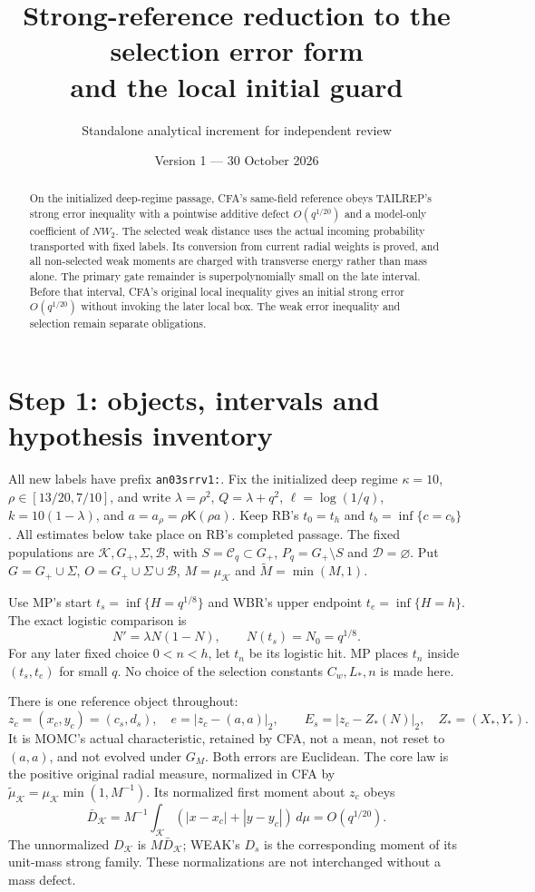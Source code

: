 \documentclass[11pt]{article}
\title{Strong-reference reduction to the selection error form\\
and the local initial guard}
\author{Standalone analytical increment for independent review}
\date{Version 1 --- 30 October 2026}
\numberwithin{equation}{section}
\theoremstyle{remark}\newtheorem{remark}[theorem]{Remark}
\newcommand{\dd}{\,d}\newcommand{\E}{\mathbb E}
\newcommand{\KK}{\mathcal K}\newcommand{\BB}{\mathcal B}
\newcommand{\Gp}{{G_+}}\newcommand{\eps}{\varepsilon}
\newcommand{\Kfun}{\mathsf K}\newcommand{\Ffun}{\mathsf F}
\begin{document}
\maketitle
\begin{abstract}
On the initialized deep-regime passage, CFA's same-field reference
obeys TAILREP's strong error inequality with a pointwise additive
defect $O(q^{1/20})$ and a model-only coefficient of $NW_2$.
The selected weak distance uses the actual incoming probability
transported with fixed labels. Its conversion from current radial
weights is proved, and all non-selected weak moments are charged
with transverse energy rather than mass alone. The primary gate
remainder is superpolynomially small on the late interval. Before
that interval, CFA's original local inequality gives an initial
strong error $O(q^{1/20})$ without invoking the later local box.
The weak error inequality and selection remain separate obligations.
\end{abstract}

\section{Step 1: objects, intervals and hypothesis inventory}
\label{an03srrv1:inventory}
All new labels have prefix \texttt{an03srrv1:}. Fix the initialized
deep regime $\kappa=10$, $\rho\in[13/20,7/10]$, and write
$\lambda=\rho^2$, $Q=\lambda+q^2$, $\ell=\log(1/q)$,
$k=10(1-\lambda)$, and $a=a_\rho=\rho\Kfun(\rho a)$.
Keep RB's $t_0=t_h$ and $t_b=\inf\{c=c_b\}$. All estimates
below take place on RB's completed passage.
The fixed populations are $\KK,\Gp,\Sigma,\BB$, with
$S=\mathcal C_q\subset\Gp$, $P_q=\Gp\setminus S$ and
$\mathcal D=\varnothing$. Put $G=\Gp\cup\Sigma$,
$O=\Gp\cup\Sigma\cup\BB$, $M=\mu_\KK$ and
$\widetilde M=\min(M,1)$.

Use MP's start $t_s=\inf\{H=q^{1/8}\}$ and WBR's upper endpoint
$t_e=\inf\{H=h\}$. The exact logistic comparison is
\[
 N'=\lambda N(1-N),\qquad N(t_s)=N_0=q^{1/8}.
\]
For any later fixed choice $0<n<h$, let $t_n$ be its logistic hit.
MP places $t_n$ inside $(t_s,t_e)$ for small $q$. No choice of the
selection constants $C_w,L_*,n$ is made here.

There is one reference object throughout:
\begin{equation}
 z_c=(x_c,y_c)=(c_s,d_s),\quad
 e=|z_c-(a,a)|_2,\qquad E_s=|z_c-Z_*(N)|_2,
 \quad Z_*=(X_*,Y_*).
 \label{an03srrv1:reference}
\end{equation}
It is MOMC's actual characteristic, retained by CFA, not a mean,
not reset to $(a,a)$, and not evolved under $G_M$. Both errors are
Euclidean. The core law is the positive original radial measure,
normalized in CFA by
$\widetilde\mu_\KK=\mu_\KK\min(1,M^{-1})$.
Its normalized first moment about $z_c$ obeys
\[
 \bar D_\KK=M^{-1}\int_\KK(|x-x_c|+|y-y_c|)\dd\mu
       =O(q^{1/20}).
\]
The unnormalized $D_\KK$ is $M\bar D_\KK$; WEAK's $D_s$ is
the corresponding moment of its unit-mass strong family.
These normalizations are not interchanged without a mass defect.
\end{document}
